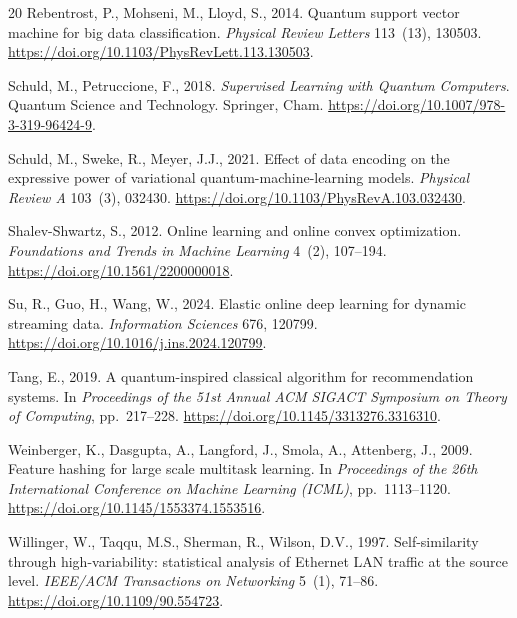 \documentclass[preprint,12pt,authoryear]{elsarticle}
\begin{document}
\begin{thebibliography}{20}
Rebentrost, P., Mohseni, M., Lloyd, S., 2014.
\newblock Quantum support vector machine for big data classification.
\newblock \emph{Physical Review Letters} 113~(13), 130503.
\newblock \url{https://doi.org/10.1103/PhysRevLett.113.130503}.

Schuld, M., Petruccione, F., 2018.
\newblock \emph{Supervised Learning with Quantum Computers}.
\newblock Quantum Science and Technology. Springer, Cham.
\newblock \url{https://doi.org/10.1007/978-3-319-96424-9}.

Schuld, M., Sweke, R., Meyer, J.J., 2021.
\newblock Effect of data encoding on the expressive power of variational quantum-machine-learning models.
\newblock \emph{Physical Review A} 103~(3), 032430.
\newblock \url{https://doi.org/10.1103/PhysRevA.103.032430}.

Shalev-Shwartz, S., 2012.
\newblock Online learning and online convex optimization.
\newblock \emph{Foundations and Trends in Machine Learning} 4~(2), 107--194.
\newblock \url{https://doi.org/10.1561/2200000018}.

Su, R., Guo, H., Wang, W., 2024.
\newblock Elastic online deep learning for dynamic streaming data.
\newblock \emph{Information Sciences} 676, 120799.
\newblock \url{https://doi.org/10.1016/j.ins.2024.120799}.

Tang, E., 2019.
\newblock A quantum-inspired classical algorithm for recommendation systems.
\newblock In \emph{Proceedings of the 51st Annual ACM SIGACT Symposium on Theory of Computing}, pp.~217--228.
\newblock \url{https://doi.org/10.1145/3313276.3316310}.

Weinberger, K., Dasgupta, A., Langford, J., Smola, A., Attenberg, J., 2009.
\newblock Feature hashing for large scale multitask learning.
\newblock In \emph{Proceedings of the 26th International Conference on Machine Learning (ICML)}, pp.~1113--1120.
\newblock \url{https://doi.org/10.1145/1553374.1553516}.

Willinger, W., Taqqu, M.S., Sherman, R., Wilson, D.V., 1997.
\newblock Self-similarity through high-variability: statistical analysis of Ethernet LAN traffic at the source level.
\newblock \emph{IEEE/ACM Transactions on Networking} 5~(1), 71--86.
\newblock \url{https://doi.org/10.1109/90.554723}.


\end{thebibliography}
\end{document}
